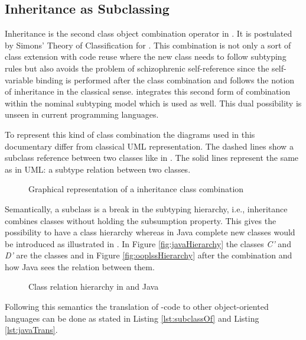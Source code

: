 \subsection{Inheritance as Subclassing}
Inheritance is the second class object combination operator in
\ooplss. It is postulated by Simons' Theory of Classification for
\cite{simons_theory_2004-2}.  This combination is not only a sort of class
extension with code reuse where the new class needs to follow subtyping
rules but also avoids the problem of schizophrenic self-reference since
the self-variable binding is performed after the class combination
and follows the notion of inheritance in the classical sense.  \ooplss
integrates this second form of combination within the nominal subtyping
model which is used as well. This dual possibility is unseen in current
programming languages.

To represent this kind of class combination the diagrams used in
this documentary differ from classical UML representation. The
dashed lines show a subclass reference between two classes like in
. The solid lines represent the same as
in UML: a subtype relation between two classes.

\begin{figure}
	\centering
	\caption{Graphical representation of a inheritance class combination}
	\label{fig:subclassCombination}
\end{figure}

Semantically, a subclass is a break in the subtyping hierarchy,
i.e., inheritance combines classes without holding the subsumption
property. This gives \ooplss the possibility to have a class hierarchy
whereas in Java complete new classes would be introduced as illustrated
in . In Figure \ref{fig:javaHierarchy} the
classes \emph{C'} and \emph{D'} are the classes \C and \D in Figure
\ref{fig:ooplssHierarchy} after the combination and how Java sees the
relation between them.

\begin{figure}
	\centering
	\caption{Class relation hierarchy in \ooplss and Java}
	\label{fig:inheritHierarchy}
\end{figure}

Following this semantics the translation of \ooplss-code to
other object-oriented languages can be done as stated in Listing
\ref{lst:subclassOf} and Listing \ref{lst:javaTrans}.

